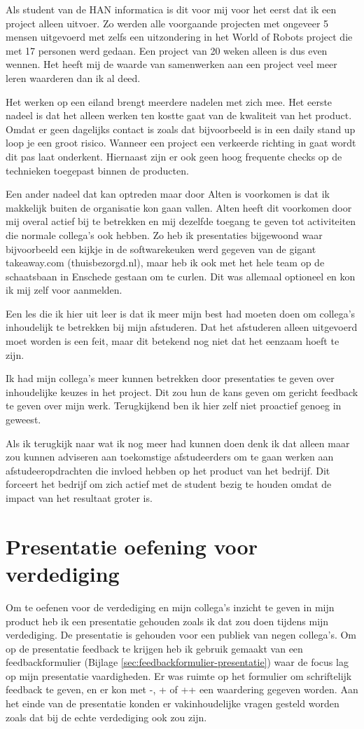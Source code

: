 \documentclass[a4paper, 11pt, oneside]{report}
\begin{document}
Als student van de HAN informatica is dit voor mij voor het eerst dat ik een project alleen uitvoer. 
Zo werden alle voorgaande projecten met ongeveer 5 mensen uitgevoerd met zelfs een uitzondering in het World of Robots project die met 17 personen werd gedaan.
Een project van 20 weken alleen is dus even wennen.
Het heeft mij de waarde van samenwerken aan een project veel meer leren waarderen dan ik al deed. 

Het werken op een eiland brengt meerdere nadelen met zich mee.
Het eerste nadeel is dat het alleen werken ten kostte gaat van de kwaliteit van het product.
Omdat er geen dagelijks contact is zoals dat bijvoorbeeld is in een daily stand up loop je een groot risico. Wanneer een project een verkeerde richting in gaat wordt dit pas laat onderkent. Hiernaast zijn er ook geen hoog frequente checks op de technieken toegepast binnen de producten.

Een ander nadeel dat kan optreden maar door Alten is voorkomen is dat ik makkelijk buiten de organisatie kon gaan vallen.
Alten heeft dit voorkomen door mij overal actief bij te betrekken en mij dezelfde toegang te geven tot activiteiten die normale collega's ook hebben. Zo heb ik presentaties bijgewoond waar bijvoorbeeld een kijkje in de softwarekeuken werd gegeven van de gigant takeaway.com (thuisbezorgd.nl), maar heb ik ook met het hele team op de schaatsbaan in Enschede gestaan om te curlen. Dit was allemaal optioneel en kon ik mij zelf voor aanmelden.

Een les die ik hier uit leer is dat ik meer mijn best had moeten doen om collega's inhoudelijk te betrekken bij mijn afstuderen. Dat het afstuderen alleen uitgevoerd moet worden is een feit, maar dit betekend nog niet dat het eenzaam hoeft te zijn.

Ik had mijn collega's meer kunnen betrekken door presentaties te geven over inhoudelijke keuzes in het project. Dit zou hun de kans geven om gericht feedback te geven over mijn werk. Terugkijkend ben ik hier zelf niet proactief genoeg in geweest.

Als ik terugkijk naar wat ik nog meer had kunnen doen denk ik dat alleen maar zou kunnen adviseren aan toekomstige afstudeerders om te gaan werken aan afstudeeropdrachten die invloed hebben op het product van het bedrijf. Dit forceert het bedrijf om zich actief met de student bezig te houden omdat de impact van het resultaat groter is. 

\section{Presentatie oefening voor verdediging}
Om te oefenen voor de verdediging en mijn collega's inzicht te geven in mijn product heb ik een presentatie gehouden zoals ik dat zou doen tijdens mijn verdediging.
De presentatie is gehouden voor een publiek van negen collega's.
Om op de presentatie feedback te krijgen heb ik gebruik gemaakt van een feedbackformulier (Bijlage \ref{sec:feedbackformulier-presentatie}) waar de focus lag op mijn presentatie vaardigheden.
Er was ruimte op het formulier om schriftelijk feedback te geven, en er kon met -, + of ++ een waardering gegeven worden.
Aan het einde van de presentatie konden er vakinhoudelijke vragen gesteld worden zoals dat bij de echte verdediging ook zou zijn.
\end{document}

